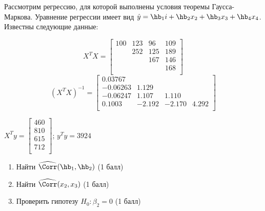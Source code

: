 \documentclass[pdftex,11pt,openany]{book}\usepackage[]{graphicx}\usepackage[]{color}
\begin{document}
\begin{problem}
Рассмотрим регрессию, для которой выполнены условия теоремы Гаусса-Маркова. Уравнение регрессии имеет вид $\hat{y} = \hb_1 i + \hb_2 x_2 + \hb_3 x_3 + \hb_4 x_4$. Известны следующие данные:

\[
X^T X = \begin{bmatrix}
100 & 123 & 96 & 109 \\
 & 252 & 125 & 189 \\
 & & 167 & 146 \\
 & & & 168 \\
\end{bmatrix}
\]
\[
(X^TX)^{-1} = \begin{bmatrix}
0.03767 & & & \\
-0.06263 & 1.129 & & \\
-0.06247 & 1.107 & 1.110 & \\
0.1003 & -2.192 & -2.170 & 4.292 \\
\end{bmatrix}
\] 

$X^Ty = \begin{bmatrix}
460\\
810\\
615\\
712\\
\end{bmatrix}$; $y^Ty = 3924$

\begin{enumerate}
\item Найти $\widehat{\Corr}(\hb_1, \hb_2)$ (1 балл)
\item Найти $\widehat{\Corr}(x_2, x_3)$ (1 балл)
\item Проверить гипотезу $H_0: \beta_2 = 0$ (1 балл)
\end{enumerate}
\end{problem}
\end{document}
